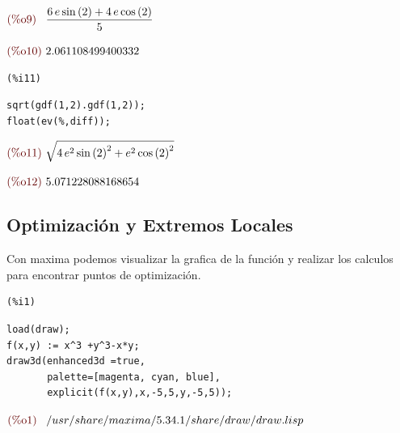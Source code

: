 \documentclass[12pt]{article}
\begin{document}
\begin{math}\displaystyle
\parbox{8ex}{\color{labelcolor}(\%o9) }
\frac{6\,e\,\mathrm{sin}\left( 2\right) +4\,e\,\mathrm{cos}\left( 2\right) }{5}
\end{math}

\begin{math}\displaystyle
\parbox{8ex}{\color{labelcolor}(\%o10) }
2.061108499400332
\end{math}


\noindent
\begin{minipage}[t]{8ex}{\color{red}\bf
\begin{verbatim}
(%i11) 
\end{verbatim}}
\end{minipage}
\begin{minipage}[t]{\textwidth}{\color{blue}
\begin{verbatim}
sqrt(gdf(1,2).gdf(1,2));
float(ev(%,diff));
\end{verbatim}}
\end{minipage}
\begin{math}\displaystyle
\parbox{8ex}{\color{labelcolor}(\%o11) }
\sqrt{4\,{e}^{2}\,{\mathrm{sin}\left( 2\right) }^{2}+{e}^{2}\,{\mathrm{cos}\left( 2\right) }^{2}}
\end{math}

\begin{math}\displaystyle
\parbox{8ex}{\color{labelcolor}(\%o12) }
5.071228088168654
\end{math}

\subsection{Optimización y Extremos Locales}
Con maxima podemos visualizar la grafica de la función y realizar los calculos para encontrar puntos de optimización.

\noindent
\begin{minipage}[t]{8ex}{\color{red}\bf
\begin{verbatim}
(%i1) 
\end{verbatim}}
\end{minipage}
\begin{minipage}[t]{\textwidth}{\color{blue}
\begin{verbatim}
load(draw);
f(x,y) := x^3 +y^3-x*y;
draw3d(enhanced3d =true,
       palette=[magenta, cyan, blue],
       explicit(f(x,y),x,-5,5,y,-5,5));
\end{verbatim}}
\end{minipage}
\begin{math}\displaystyle
\parbox{8ex}{\color{labelcolor}(\%o1) }
/usr/share/maxima/5.34.1/share/draw/draw.lisp
\end{math}
\end{document}
